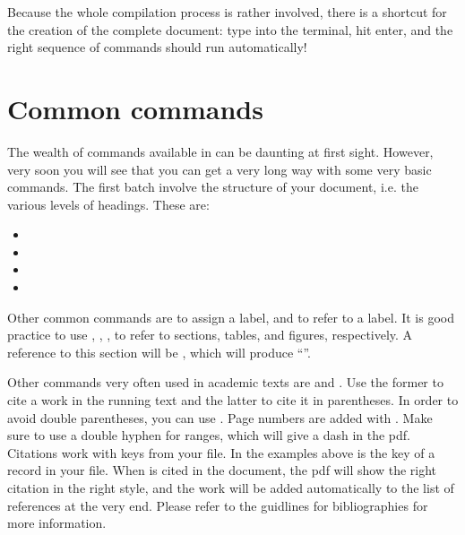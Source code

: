Because the whole compilation process is rather involved, there is a shortcut for the creation of the complete document: type  into the terminal, hit enter, and the right sequence of commands should run automatically!


\section{Common commands}\label{sec:latex:commoncommands}
The wealth of commands available in \latex can be daunting at first sight. However, very soon you will see that you can get a very long way with some very basic commands. The first batch involve the structure of your document, i.e. the various levels of headings. These are:
\begin{itemize}
 \item {}
\item {}
\item {}
\item {}
\end{itemize}
 
Other common commands are 
to assign a label, and 
to refer to a label. It is good practice to use 
,
,
,
to refer to sections, tables, and figures, respectively. A reference to this section will be , which will produce ``''.

Other commands very often used in academic texts are  and . Use the former to cite a work in the running text and the latter to cite it in parentheses. In order to avoid double parentheses, you can use  . Page numbers are added with . Make sure to use a double hyphen for ranges, which will give a dash in the pdf. Citations work with keys from your \bibtex file. In the examples above  is the key of a record in your \bibtex file. When  is cited in the document, the pdf will show the right citation in the right style, and the work will be added automatically to the list of references at the very end. Please refer to the guidlines for bibliographies for more information.


